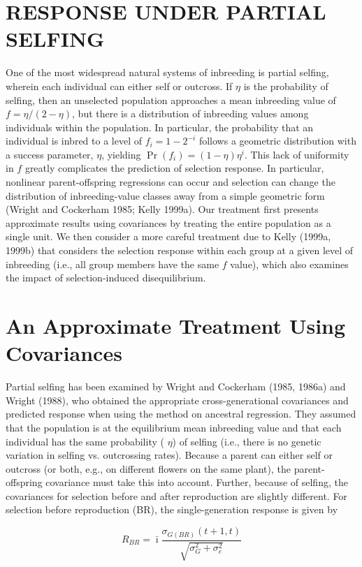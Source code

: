 \documentclass{article}
\begin{document}
\section{RESPONSE UNDER PARTIAL SELFING}
One of the most widespread natural systems of inbreeding is partial selfing, wherein each individual can either self or outcross. If  $ \eta $ is the probability of selfing, then an unselected population approaches a mean inbreeding value of  $ f = \eta/(2 - \eta) $, but there is a distribution of inbreeding values among individuals within the population. In particular, the probability that an individual is inbred to a level of  $ f_i = 1 - 2^{-i} $ follows a geometric distribution with a success parameter,  $ \eta $, yielding  $ \Pr(f_i) = (1 - \eta)\eta^i $. This lack of uniformity in  $ f $ greatly complicates the prediction of selection response. In particular, nonlinear parent-offspring regressions can occur and selection can change the distribution of inbreeding-value classes away from a simple geometric form (Wright and Cockerham 1985; Kelly 1999a). Our treatment first presents approximate results using covariances by treating the entire population as a single unit. We then consider a more careful treatment due to Kelly (1999a, 1999b) that considers the selection response within each group at a given level of inbreeding (i.e., all group members have the same  $ f $ value), which also examines the impact of selection-induced disequilibrium.

\section{An Approximate Treatment Using Covariances}
Partial selfing has been examined by Wright and Cockerham (1985, 1986a) and Wright (1988), who obtained the appropriate cross-generational covariances and predicted response when using the method on ancestral regression. They assumed that the population is at the equilibrium mean inbreeding value and that each individual has the same probability ( $ \eta $) of selfing (i.e., there is no genetic variation in selfing vs. outcrossing rates). Because a parent can either self or outcross (or both, e.g., on different flowers on the same plant), the parent-offspring covariance must take this into account. Further, because of selfing, the covariances for selection before and after reproduction are slightly different. For selection before reproduction (BR), the single-generation response is given by

\begin{equation}
R_{BR}=\bar{\imath}\frac{\sigma_{G(BR)}(t+1,t)}{\sqrt{\sigma_{G}^{2}+\sigma_{e}^{2}}}
\tag{23.56a}
\label{eq:23_56a}
\end{equation}
\end{document}
